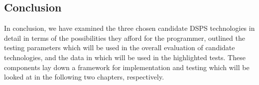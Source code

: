 \subsection{Conclusion} %
\label{sub:conclusion}

In conclusion, we have examined the three chosen candidate DSPS technologies in detail in terms of the possibilities they
afford for the programmer, outlined the testing parameters which will be used in the overall evaluation of candidate
technologies, and the data in which will be used in the highlighted tests. These components lay down a framework for
implementation and testing which will be looked at in the following two chapters, respectively.


